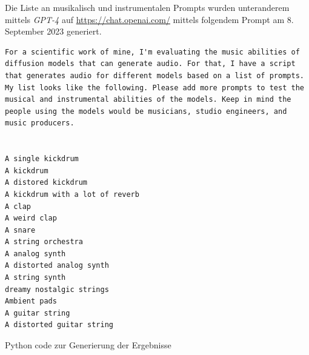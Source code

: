 \documentclass[
  a4paper,  %
  twoside,  %
  bibliography=totoc,
  headsepline,
  cleardoublepage=empty,
  parskip=half,
  draft=false
]{scrbook}
\begin{document}
Die Liste an musikalisch und instrumentalen Prompts wurden unteranderem mittels \emph{GPT-4}\cite{openai_gpt-4_2023} auf \url{https://chat.openai.com/} mittels folgendem Prompt am 8. September 2023 generiert. 


\begin{lstlisting}[style=gpt]
For a scientific work of mine, I'm evaluating the music abilities of diffusion models that can generate audio. For that, I have a script that generates audio for different models based on a list of prompts. My list looks like the following. Please add more prompts to test the musical and instrumental abilities of the models. Keep in mind the people using the models would be musicians, studio engineers, and music producers. 


A single kickdrum
A kickdrum
A distored kickdrum
A kickdrum with a lot of reverb
A clap
A weird clap
A snare
A string orchestra
A analog synth
A distorted analog synth
A string synth
dreamy nostalgic strings
Ambient pads
A guitar string
A distorted guitar string
\end{lstlisting}

\begin{Listing}

 \caption{Python code zur Generierung der Ergebnisse}
  \label{lst:generator}
\end{Listing}
%
\pagestyle{empty}
\renewcommand*{\chapterpagestyle}{empty}
\Affirmation
\end{document}
